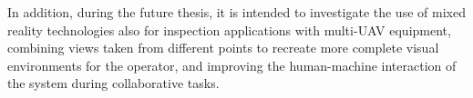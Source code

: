 In addition, during the future thesis, it is intended to investigate the use of mixed reality technologies also for inspection applications with multi-\gls{UAV} equipment, combining views taken from different points to recreate more complete visual environments for the operator, and improving the human-machine interaction of the system during collaborative tasks.

\endinput
